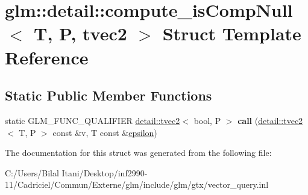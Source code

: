 \hypertarget{structglm_1_1detail_1_1compute__is_comp_null_3_01_t_00_01_p_00_01tvec2_01_4}{}\section{glm\+:\+:detail\+:\+:compute\+\_\+is\+Comp\+Null$<$ T, P, tvec2 $>$ Struct Template Reference}
\label{structglm_1_1detail_1_1compute__is_comp_null_3_01_t_00_01_p_00_01tvec2_01_4}
\subsection*{Static Public Member Functions}
\begin{DoxyCompactItemize}
\item 
static G\+L\+M\+\_\+\+F\+U\+N\+C\+\_\+\+Q\+U\+A\+L\+I\+F\+I\+ER \hyperlink{structglm_1_1detail_1_1tvec2}{detail\+::tvec2}$<$ bool, P $>$ {\bfseries call} (\hyperlink{structglm_1_1detail_1_1tvec2}{detail\+::tvec2}$<$ T, P $>$ const \&v, T const \&\hyperlink{group__gtc__constants_gacb41049b8d22c8aa90e362b96c524feb}{epsilon})\hypertarget{structglm_1_1detail_1_1compute__is_comp_null_3_01_t_00_01_p_00_01tvec2_01_4_abf9b6241b4469888505eb8d3a5f5afb5}{}\label{structglm_1_1detail_1_1compute__is_comp_null_3_01_t_00_01_p_00_01tvec2_01_4_abf9b6241b4469888505eb8d3a5f5afb5}

\end{DoxyCompactItemize}


The documentation for this struct was generated from the following file\+:\begin{DoxyCompactItemize}
\item 
C\+:/\+Users/\+Bilal Itani/\+Desktop/inf2990-\/11/\+Cadriciel/\+Commun/\+Externe/glm/include/glm/gtx/vector\+\_\+query.\+inl\end{DoxyCompactItemize}

